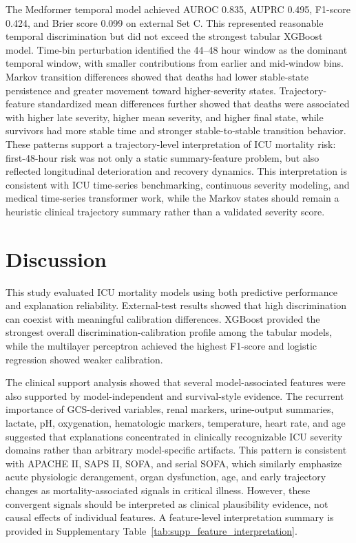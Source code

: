 \documentclass[10pt,twocolumn,letterpaper]{article}
\begin{document}
The Medformer temporal model achieved AUROC 0.835, AUPRC 0.495, F1-score 0.424, and Brier score 0.099 on external Set C. This represented reasonable temporal discrimination but did not exceed the strongest tabular XGBoost model. Time-bin perturbation identified the 44--48 hour window as the dominant temporal window, with smaller contributions from earlier and mid-window bins. Markov transition differences showed that deaths had lower stable-state persistence and greater movement toward higher-severity states. Trajectory-feature standardized mean differences further showed that deaths were associated with higher late severity, higher mean severity, and higher final state, while survivors had more stable time and stronger stable-to-stable transition behavior. These patterns support a trajectory-level interpretation of ICU mortality risk: first-48-hour risk was not only a static summary-feature problem, but also reflected longitudinal deterioration and recovery dynamics. This interpretation is consistent with ICU time-series benchmarking, continuous severity modeling, and medical time-series transformer work, while the Markov states should remain a heuristic clinical trajectory summary rather than a validated severity score\cite{harutyunyan2019benchmarking,shickel2019deepsofa,wang2024medformer}.

\section{Discussion}

This study evaluated ICU mortality models using both predictive performance and explanation reliability. External-test results showed that high discrimination can coexist with meaningful calibration differences. XGBoost provided the strongest overall discrimination-calibration profile among the tabular models, while the multilayer perceptron achieved the highest F1-score and logistic regression showed weaker calibration.

The clinical support analysis showed that several model-associated features were also supported by model-independent and survival-style evidence. The recurrent importance of GCS-derived variables, renal markers, urine-output summaries, lactate, pH, oxygenation, hematologic markers, temperature, heart rate, and age suggested that explanations concentrated in clinically recognizable ICU severity domains rather than arbitrary model-specific artifacts. This pattern is consistent with APACHE II, SAPS II, SOFA, and serial SOFA, which similarly emphasize acute physiologic derangement, organ dysfunction, age, and early trajectory changes as mortality-associated signals in critical illness\cite{knaus1985apache,legall1993saps,vincent1996sofa,ferreira2001sofa}. However, these convergent signals should be interpreted as clinical plausibility evidence, not causal effects of individual features. A feature-level interpretation summary is provided in Supplementary Table~\ref{tab:supp_feature_interpretation}.
\end{document}
